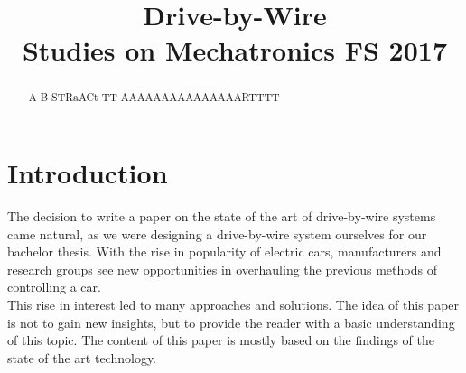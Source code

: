 \documentclass[conference]{IEEEtran}
\begin{document}
\title{
Drive-by-Wire
\\[0.5cm]
\large{Studies on Mechatronics FS 2017}
}

\author{
\and

}

\maketitle

\setlength\parindent{0pt}
\newcommand{\spn}[1]{\textsc{Span} \left\{ #1 \right\}}
\newcommand{\dimension}[1]{\textsc{dim} \left\{ #1 \right\}}
\newcommand{\real}[1]{\textsc{Re} \left( #1 \right)}
\newcommand{\imag}[1]{\textsc{Im} \left( #1 \right)}
\newcommand{\DET}[1]{\textsc{Det} \left[ #1 \right]}
\newcommand*\rfrac[2]{{}^{#1}\!/_{#2}}


\thispagestyle{plain}
\pagestyle{plain}

\begin{abstract}
A   B STRaACt   TT  AAAAAAAAAAAAAAARTTTT
\end{abstract}


\section{Introduction}

The decision to write a paper on the state of the art of drive-by-wire systems came natural, as we were designing a drive-by-wire system ourselves for our bachelor thesis. With the rise in popularity of electric cars, manufacturers and research groups see new opportunities in overhauling the previous methods of controlling a car.\\
This rise in interest led to many approaches and solutions. The idea of this paper is not to gain new insights, but to provide the reader with a basic understanding of this topic. The content of this paper is mostly based on the findings of the state of the art technology.
\end{document}
